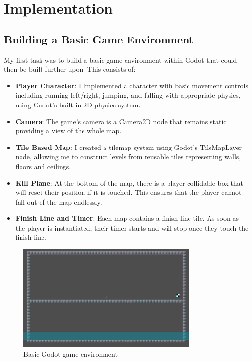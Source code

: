 \chapter{Implementation}

\section{Building a Basic Game Environment}

My first task was to build a basic game environment within Godot that could then be built further upon.
This consists of:
\begin{itemize}
    \item \textbf{Player Character}: I implemented a character with basic movement controls including running left/right, jumping, and falling with appropriate physics, using Godot's built in 2D physics system.
    \item \textbf{Camera}: The game's camera is a Camera2D node that remains static providing a view of the whole map.
    \item \textbf{Tile Based Map}: I created a tilemap system using Godot's TileMapLayer node, allowing me to construct levels from reusable tiles representing walls, floors and ceilings.
    \item \textbf{Kill Plane}: At the bottom of the map, there is a player collidable box that will reset their position if it is touched. This ensures that the player cannot fall out of the map endlessly.
    \item \textbf{Finish Line and Timer}: Each map contains a finish line tile. As soon as the player is instantiated, their timer starts and will stop once they touch the finish line.
\end{itemize}

\begin{figure}[H]
    \centering
    \includegraphics[width=0.8\textwidth]{figures/godot_environment_basic}
    \caption{Basic Godot game environment}
    \label{fig:godot_environment_basic}
\end{figure}

